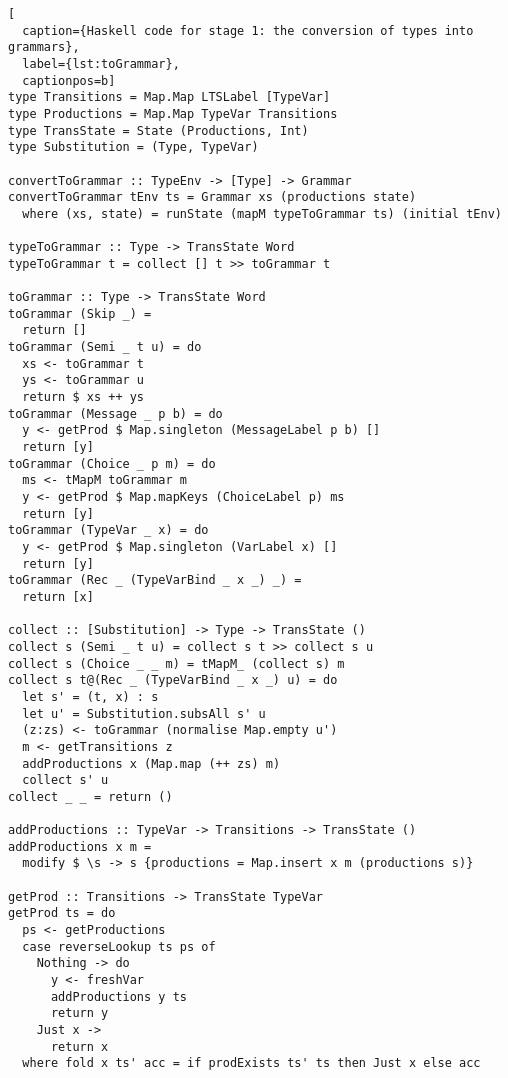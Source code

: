 \begin{lstlisting}[
  caption={Haskell code for stage 1: the conversion of types into grammars},
  label={lst:toGrammar},
  captionpos=b]
type Transitions = Map.Map LTSLabel [TypeVar]
type Productions = Map.Map TypeVar Transitions
type TransState = State (Productions, Int)
type Substitution = (Type, TypeVar)

convertToGrammar :: TypeEnv -> [Type] -> Grammar
convertToGrammar tEnv ts = Grammar xs (productions state)
  where (xs, state) = runState (mapM typeToGrammar ts) (initial tEnv)

typeToGrammar :: Type -> TransState Word
typeToGrammar t = collect [] t >> toGrammar t

toGrammar :: Type -> TransState Word
toGrammar (Skip _) =
  return []
toGrammar (Semi _ t u) = do
  xs <- toGrammar t
  ys <- toGrammar u
  return $ xs ++ ys
toGrammar (Message _ p b) = do
  y <- getProd $ Map.singleton (MessageLabel p b) []
  return [y]
toGrammar (Choice _ p m) = do
  ms <- tMapM toGrammar m
  y <- getProd $ Map.mapKeys (ChoiceLabel p) ms
  return [y]
toGrammar (TypeVar _ x) = do      
  y <- getProd $ Map.singleton (VarLabel x) []
  return [y]
toGrammar (Rec _ (TypeVarBind _ x _) _) =
  return [x]
  
collect :: [Substitution] -> Type -> TransState ()
collect s (Semi _ t u) = collect s t >> collect s u
collect s (Choice _ _ m) = tMapM_ (collect s) m
collect s t@(Rec _ (TypeVarBind _ x _) u) = do
  let s' = (t, x) : s
  let u' = Substitution.subsAll s' u
  (z:zs) <- toGrammar (normalise Map.empty u')
  m <- getTransitions z
  addProductions x (Map.map (++ zs) m)
  collect s' u
collect _ _ = return ()

addProductions :: TypeVar -> Transitions -> TransState ()
addProductions x m =
  modify $ \s -> s {productions = Map.insert x m (productions s)}

getProd :: Transitions -> TransState TypeVar
getProd ts = do
  ps <- getProductions
  case reverseLookup ts ps of
    Nothing -> do
      y <- freshVar
      addProductions y ts
      return y
    Just x ->
      return x
  where fold x ts' acc = if prodExists ts' ts then Just x else acc
\end{lstlisting}



